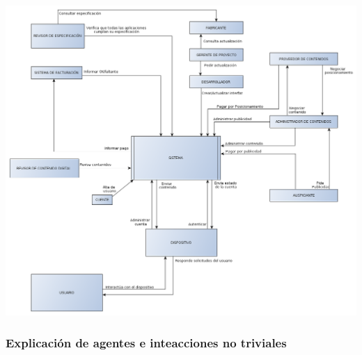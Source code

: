 \documentclass[11pt, a4paper, spanish]{article}
\begin{document}
	\begin{center}
		\includegraphics[scale=0.35]{Diagramas/DiagramaContexto.png}
	\end{center}
\subsubsection{Explicaci\'on de agentes e inteacciones no triviales}
\end{document}
